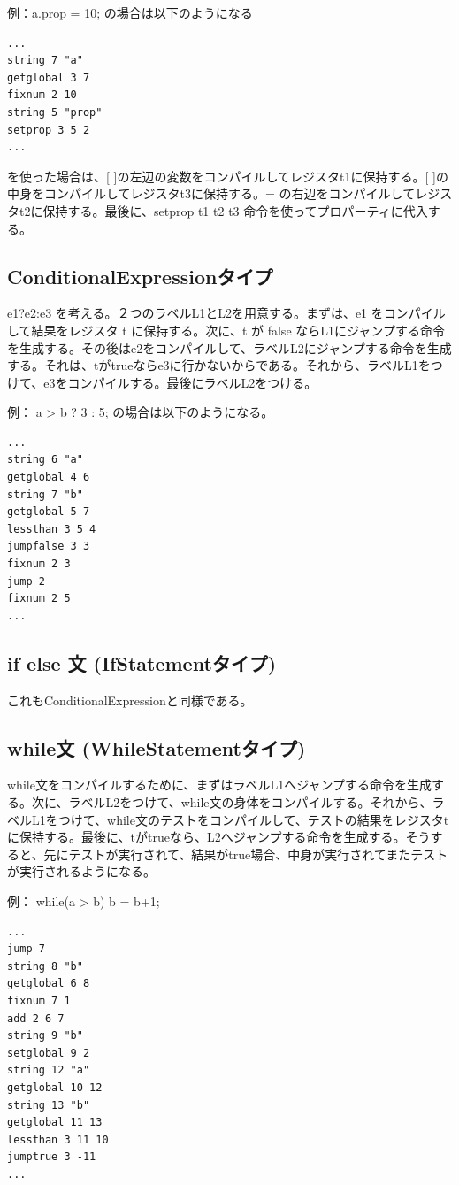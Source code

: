 \documentclass[12pt]{article}
\begin{document}
例：a.prop = 10; の場合は以下のようになる

\begin{lstlisting}
...
string 7 "a"
getglobal 3 7
fixnum 2 10
string 5 "prop"
setprop 3 5 2
...
\end{lstlisting}
\FloatBarrier
\hfill \break
[ ] を使った場合は、[ ]の左辺の変数をコンパイルしてレジスタt1に保持する。[ ]の中身をコンパイルしてレジスタt3に保持する。= の右辺をコンパイルしてレジスタt2に保持する。最後に、setprop t1 t2 t3 命令を使ってプロパーティに代入する。

\subsection{ConditionalExpressionタイプ}
e1?e2:e3 を考える。２つのラベルL1とL2を用意する。まずは、e1 をコンパイルして結果をレジスタ t に保持する。次に、t が false ならL1にジャンプする命令を生成する。その後はe2をコンパイルして、ラベルL2にジャンプする命令を生成する。それは、tがtrueならe3に行かないからである。それから、ラベルL1をつけて、e3をコンパイルする。最後にラベルL2をつける。

例： a > b ? 3 : 5; の場合は以下のようになる。\\

\begin{lstlisting}
...
string 6 "a"
getglobal 4 6
string 7 "b"
getglobal 5 7
lessthan 3 5 4
jumpfalse 3 3
fixnum 2 3
jump 2
fixnum 2 5
...
\end{lstlisting}

\subsection{if else 文 (IfStatementタイプ)}
これもConditionalExpressionと同様である。

\subsection{while文 (WhileStatementタイプ)}
while文をコンパイルするために、まずはラベルL1へジャンプする命令を生成する。次に、ラベルL2をつけて、while文の身体をコンパイルする。それから、ラベルL1をつけて、while文のテストをコンパイルして、テストの結果をレジスタtに保持する。最後に、tがtrueなら、L2へジャンプする命令を生成する。そうすると、先にテストが実行されて、結果がtrue場合、中身が実行されてまたテストが実行されるようになる。

例： while(a > b) b = b+1;\\

\begin{lstlisting}
...
jump 7
string 8 "b"
getglobal 6 8
fixnum 7 1
add 2 6 7
string 9 "b"
setglobal 9 2
string 12 "a"
getglobal 10 12
string 13 "b"
getglobal 11 13
lessthan 3 11 10
jumptrue 3 -11
...
\end{lstlisting}
\end{document}
